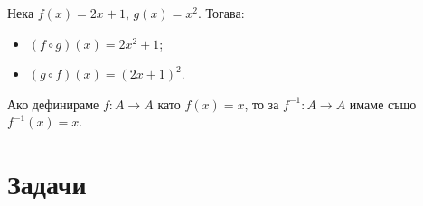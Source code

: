 \begin{example}
  Нека $f(x) = 2x+1$, $g(x) = x^2$. Тогава:
  \begin{itemize}
  \item 
    $(f\circ g)(x) = 2x^2 + 1$;
  \item
    $(g\circ f)(x) = (2x+1)^2$.
  \end{itemize}
\end{example}

\begin{example}
  Ако дефинираме $f:A\to A$ като $f(x) = x$, 
  то за $f^{-1}:A\to A$ имаме също $f^{-1}(x) = x$.
\end{example}

  





  
  





\section{Задачи}

